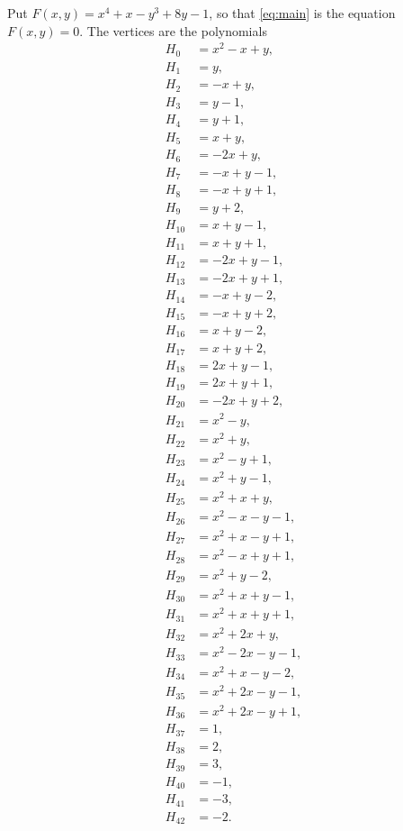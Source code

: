 \documentclass[11pt]{article}
\begin{document}
Put $F(x,y)=x^{4}+x-y^{3}+8y-1$, so that \eqref{eq:main} is the equation $F(x,y)=0$. The vertices are the polynomials
\begin{align*}
H_{0}&=x^{2}-x+y,\\
H_{1}&=y,\\
H_{2}&=-x+y,\\
H_{3}&=y-1,\\
H_{4}&=y+1,\\
H_{5}&=x+y,\\
H_{6}&=-2x+y,\\
H_{7}&=-x+y-1,\\
H_{8}&=-x+y+1,\\
H_{9}&=y+2,\\
H_{10}&=x+y-1,\\
H_{11}&=x+y+1,\\
H_{12}&=-2x+y-1,\\
H_{13}&=-2x+y+1,\\
H_{14}&=-x+y-2,\\
H_{15}&=-x+y+2,\\
H_{16}&=x+y-2,\\
H_{17}&=x+y+2,\\
H_{18}&=2x+y-1,\\
H_{19}&=2x+y+1,\\
H_{20}&=-2x+y+2,\\
H_{21}&=x^{2}-y,\\
H_{22}&=x^{2}+y,\\
H_{23}&=x^{2}-y+1,\\
H_{24}&=x^{2}+y-1,\\
H_{25}&=x^{2}+x+y,\\
H_{26}&=x^{2}-x-y-1,\\
H_{27}&=x^{2}+x-y+1,\\
H_{28}&=x^{2}-x+y+1,\\
H_{29}&=x^{2}+y-2,\\
H_{30}&=x^{2}+x+y-1,\\
H_{31}&=x^{2}+x+y+1,\\
H_{32}&=x^{2}+2x+y,\\
H_{33}&=x^{2}-2x-y-1,\\
H_{34}&=x^{2}+x-y-2,\\
H_{35}&=x^{2}+2x-y-1,\\
H_{36}&=x^{2}+2x-y+1,\\
H_{37}&=1,\\
H_{38}&=2,\\
H_{39}&=3,\\
H_{40}&=-1,\\
H_{41}&=-3,\\
H_{42}&=-2.
\end{align*}
\end{document}
